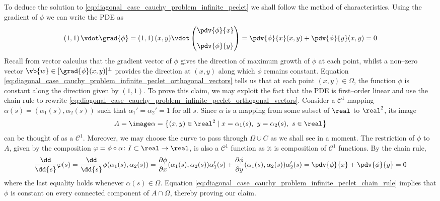 To deduce the solution to
\eqref{eq:diagonal_case_cauchy_problem_infinite_peclet} we shall follow the
method of characteristics. Using the gradient of $\phi$ we can write the PDE as
\begin{equation} \label{eq:diagonal_case_cauchy_problem_infinite_peclet_orthogonal_vectors}
	\left( 1, 1 \right)
	\vdot
	\grad{\phi} = 
	\left( 1, 1 \right)(x,y)
	\vdot
	\begin{pmatrix}
		\displaystyle\pdv{\phi}{x} \\[10pt] \displaystyle\pdv{\phi}{y}
	\end{pmatrix} = 
	\pdv{\phi}{x}(x,y) + \pdv{\phi}{y}(x,y) = 0
\end{equation}
Recall from vector calculus that the gradient vector of $\phi$ gives the
direction of maximum growth of $\phi$ at each point, whilst a non--zero vector
$\vb{w} \in [\grad{\phi}(x,y)]^\perp$ provides the direction at $(x,y)$ along
which $\phi$ remains constant. Equation
\eqref{eq:diagonal_case_cauchy_problem_infinite_peclet_orthogonal_vectors} tells
us that at each point $(x,y) \in \Omega$, the function $\phi$ is constant along
the direction given by $(1, 1)$. To prove this claim, we may exploit the fact
that the PDE is first--order linear and use the chain rule to rewrite
\eqref{eq:diagonal_case_cauchy_problem_infinite_peclet_orthogonal_vectors}.
Consider a $\mathcal{C}^1$ mapping $\alpha(s) = (\alpha_1(s), \alpha_2(s))$ such
that $\alpha_1' = \alpha_2' = 1$ for all $s$. Since $\alpha$ is a mapping from
some subset of $\real$ to $\real^2$, its image
\begin{equation}
	A = 
	\image \alpha = 
	\left\{ (x,y) \in \real^2 \mid x = \alpha_1(s), \ y = \alpha_2(s), \ s \in \real \right\}
\end{equation}
can be thought of as a $\mathcal{C}^1$. Moreover, we may choose the curve to
pass through $\Omega \cup C$ as we shall see in a moment. The restriction of $\phi$
to $A$, given by the composition $\varphi = \phi \circ \alpha \colon I \subset
\real \rightarrow \real$, is also a $\mathcal{C}^1$ function as it is
composition of $\mathcal{C}^1$ functions. By the chain rule,
\begin{equation} \label{eq:diagonal_case_cauchy_problem_infinite_peclet_chain_rule}
	\frac{\dd}{\dd{s}} \varphi(s) = 
	\frac{\dd}{\dd{s}} \phi(\alpha_1(s), \alpha_2(s)) = 
	\frac{\partial \phi}{\partial x} (\alpha_1(s), \alpha_2(s)) \alpha_1'(s) +  	
	\frac{\partial \phi}{\partial y} (\alpha_1(s), \alpha_2(s)) \alpha_2'(s) =
	\pdv{\phi}{x} + \pdv{\phi}{y} = 0
\end{equation}
where the last equality holds whenever $\alpha(s) \in \Omega$. Equation
\eqref{eq:diagonal_case_cauchy_problem_infinite_peclet_chain_rule} implies that
$\phi$ is constant on every connected component of $A \cap
\Omega$, thereby proving our claim. 

